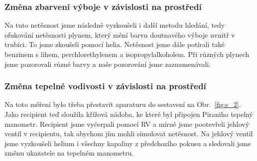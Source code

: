 \documentclass[english]{article}
\begin{document}
		\subsubsection{Změna zbarvení výboje v závislosti na prostředí}
			Na tuto netěsnost jsme následně vyzkoušeli i další metodu hledání, tedy ofukování netěsnosti plynem, který mění barvu doutnavého výboje uvnitř v trubici. To jsme zkoušeli pomocí helia. Netěsnost jsme dále potírali také benzinem s lihem, perchlorethylenem a isopropylalkoholem. Při různých plynech jsme pozorovali různé barvy a naše pozorování jsme zaznamenávali.
		
		\subsubsection{Změna tepelné vodivosti v závislosti na prostředí}
			Na toto měření bylo třeba přestavit aparaturu do sestavení na Obr.~\ref{fig:s_2}. Jako recipient teď sloužila křížová nádoba, ke které byl připojen Piraniho tepelný manometr. Recipient jsme vyčerpali pomocí RV a mírně jsme pootevřeli jehlový ventil v recipientu, tak abychom jím mohli simulovat netěsnost. Na jehlový ventil jsme vyzkoušeli helium i všechny kapaliny z předchozího pokusu a sledovali jsme změnu ukazatele na tepelném manometru.
\end{document}
